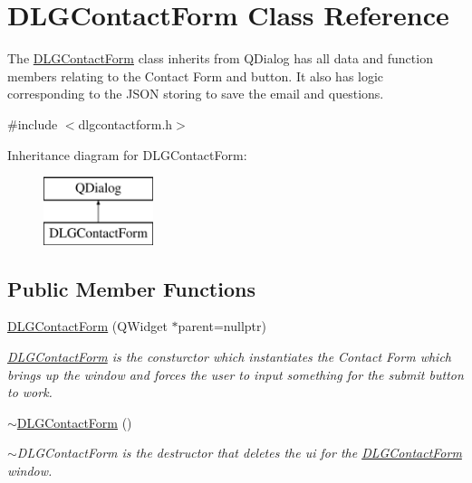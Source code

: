 \hypertarget{class_d_l_g_contact_form}{}\section{D\+L\+G\+Contact\+Form Class Reference}
\label{class_d_l_g_contact_form}


The \mbox{\hyperlink{class_d_l_g_contact_form}{D\+L\+G\+Contact\+Form}} class inherits from Q\+Dialog has all data and function members relating to the Contact Form and button. It also has logic corresponding to the J\+S\+ON storing to save the email and questions.  




{\ttfamily \#include $<$dlgcontactform.\+h$>$}

Inheritance diagram for D\+L\+G\+Contact\+Form\+:\begin{figure}[H]
\begin{center}
\leavevmode
\includegraphics[height=2.000000cm]{class_d_l_g_contact_form}
\end{center}
\end{figure}
\subsection*{Public Member Functions}
\begin{DoxyCompactItemize}
\item 
\mbox{\hyperlink{class_d_l_g_contact_form_a86b60a67ed1a97bfe07a30c6476739c4}{D\+L\+G\+Contact\+Form}} (Q\+Widget $\ast$parent=nullptr)
\begin{DoxyCompactList}\small\item\em \mbox{\hyperlink{class_d_l_g_contact_form}{D\+L\+G\+Contact\+Form}} is the consturctor which instantiates the Contact Form which brings up the window and forces the user to input something for the submit button to work. \end{DoxyCompactList}\item 
\mbox{\label{class_d_l_g_contact_form_a658c129dda1c93470621c36861fa0e47}} 
\mbox{\hyperlink{class_d_l_g_contact_form_a658c129dda1c93470621c36861fa0e47}{$\sim$\+D\+L\+G\+Contact\+Form}} ()
\begin{DoxyCompactList}\small\item\em $\sim$\+D\+L\+G\+Contact\+Form is the destructor that deletes the ui for the \mbox{\hyperlink{class_d_l_g_contact_form}{D\+L\+G\+Contact\+Form}} window. \end{DoxyCompactList}\end{DoxyCompactItemize}


